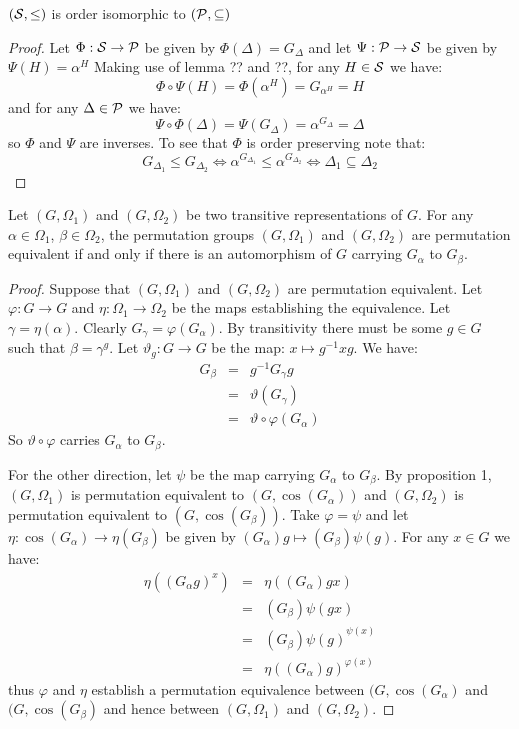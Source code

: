 \begin{proposition}
$(\mathcal{S}, \leq)$ is order isomorphic to $(\mathcal{P}, \subseteq)$

\begin{proof}
Let $\Phi : \mathcal{S} \to \mathcal{P}$ be given by
$\Phi(\Delta) = G_{\Delta}$
and let $\Psi : \mathcal{P} \to \mathcal{S}$ be given by
$\Psi(H) = \alpha^H$
Making use of lemma ?? and ??,
for any $H \in \mathcal{S}$ we have:
$$ \Phi \circ \Psi(H) = \Phi(\alpha^H) = G_{\alpha^H} = H $$
and for any $\Delta \in \mathcal{P}$ we have:
$$ \Psi \circ \Phi(\Delta) = \Psi (G_{\Delta}) = \alpha^{G_{\Delta}} = \Delta $$
so $\Phi$ and $\Psi$ are inverses.
To see that $\Phi$ is order preserving note that:
$$ G_{\Delta_1} \leq G_{\Delta_2} 
\Longleftrightarrow \alpha^{G_{\Delta_1}} \leq \alpha^{G_{\Delta_2}}
\Longleftrightarrow \Delta_1 \subseteq \Delta_2  $$
\end{proof}
\end{proposition}



\begin{proposition}
Let $(G,\Omega_1)$ and $(G,\Omega_2)$ be two transitive representations
of $G$. For any $\alpha \in \Omega_1$, $\beta \in \Omega_2$,
the permutation groups $(G,\Omega_1)$ and $(G,\Omega_2)$
are permutation equivalent if and only if there is an automorphism of $G$
carrying $G_\alpha$ to $G_\beta$.
\begin{proof}
Suppose that $(G, \Omega_1)$ and $(G, \Omega_2)$ are permutation equivalent.
Let $\varphi: G \to G$ and $\eta : \Omega_1 \to \Omega_2$ be the maps
establishing the equivalence. 
Let $\gamma = \eta(\alpha)$.
Clearly $G_\gamma = \varphi(G_\alpha)$.
By transitivity there must be some $g \in G$ such that $\beta = \gamma^g$.
Let $\vartheta_g : G \to G$ be the map: $x \mapsto g^{-1} x g$.
We have:
\begin{eqnarray*} 
G_\beta & = & g^{-1}G_\gamma g \\
        & = & \vartheta(G_\gamma) \\
	& = & \vartheta \circ \varphi (G_\alpha)
\end{eqnarray*}
So $\vartheta \circ \varphi$ carries $G_\alpha$ to $G_\beta$.

For the other direction, let $\psi$ be the map carrying $G_\alpha$
to $G_\beta$. By proposition 1,
$(G, \Omega_1)$ is permutation equivalent to $(G, \cos(G_\alpha))$
and $(G, \Omega_2)$ is permutation equivalent to $(G, \cos(G_\beta))$.
Take $\varphi = \psi$ and let 
$\eta: \cos(G_\alpha) \to \eta(G_\beta)$ be given by
$(G_\alpha) g \mapsto (G_\beta) \psi(g)$.
For any $x \in G$ we have:
\begin{eqnarray*}
\eta({(G_\alpha g)}^x) & = & \eta((G_\alpha) gx) \\
                     & = & (G_\beta) \psi(gx)  \\
		     & = & {(G_\beta) \psi(g)}^{\psi(x)} \\
		     & = & \eta((G_\alpha) g)^{\varphi(x)}
\end{eqnarray*}
thus $\varphi$ and $\eta$ establish a permutation equivalence between
$(G, \cos(G_\alpha)$ and $(G, \cos(G_\beta)$ and hence between
$(G, \Omega_1)$ and $(G, \Omega_2)$.
\end{proof}
\end{proposition}


